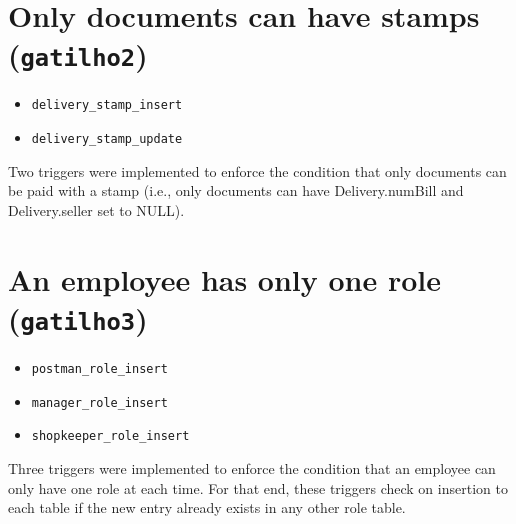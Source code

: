 \documentclass{report}[a4paper]
\theoremstyle{remark}
\begin{document}
\section{Only documents can have stamps (\texttt{gatilho2})}
\begin{itemize}
    \item \texttt{delivery\_stamp\_insert}
    \item \texttt{delivery\_stamp\_update}
\end{itemize}
Two triggers were implemented to enforce the condition that only documents can be paid with a stamp (i.e., only documents can have Delivery.numBill and Delivery.seller set to NULL).

\section{An employee has only one role (\texttt{gatilho3})}
\begin{itemize}
    \item \texttt{postman\_role\_insert}
    \item \texttt{manager\_role\_insert}
    \item \texttt{shopkeeper\_role\_insert}
\end{itemize}
Three triggers were implemented to enforce the condition that an employee can only have one role at each time. For that end, these triggers check on insertion to each table if the new entry already exists in any other role table.
\end{document}
